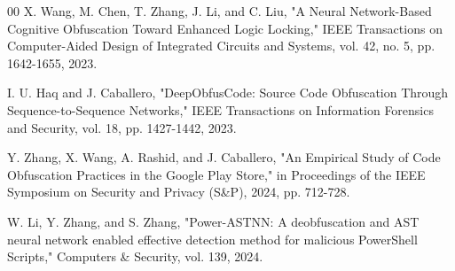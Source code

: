 \documentclass[conference]{IEEEtran}
\begin{document}
\begin{thebibliography}{00}
 X. Wang, M. Chen, T. Zhang, J. Li, and C. Liu, "A Neural Network-Based Cognitive Obfuscation Toward Enhanced Logic Locking," IEEE Transactions on Computer-Aided Design of Integrated Circuits and Systems, vol. 42, no. 5, pp. 1642-1655, 2023.

 I. U. Haq and J. Caballero, "DeepObfusCode: Source Code Obfuscation Through Sequence-to-Sequence Networks," IEEE Transactions on Information Forensics and Security, vol. 18, pp. 1427-1442, 2023.

 Y. Zhang, X. Wang, A. Rashid, and J. Caballero, "An Empirical Study of Code Obfuscation Practices in the Google Play Store," in Proceedings of the IEEE Symposium on Security and Privacy (S&P), 2024, pp. 712-728.

 W. Li, Y. Zhang, and S. Zhang, "Power-ASTNN: A deobfuscation and AST neural network enabled effective detection method for malicious PowerShell Scripts," Computers & Security, vol. 139, 2024.

\end{thebibliography}
\end{document}
